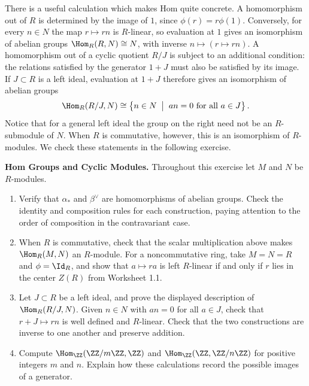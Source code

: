 \documentclass[12pt,reqno]{amsart}
\begin{document}
There is a useful calculation which makes Hom quite concrete. A homomorphism out of $R$ is determined by the image of $1$, since $\phi(r)=r\phi(1)$. Conversely, for every $n\in N$ the map $r\mapsto rn$ is $R$-linear, so evaluation at $1$ gives an isomorphism of abelian groups $\Hom_R(R,N)\cong N$, with inverse $n\mapsto(r\mapsto rn)$. A homomorphism out of a cyclic quotient $R/J$ is subject to an additional condition: the relations satisfied by the generator $1+J$ must also be satisfied by its image. If $J\subset R$ is a left ideal, evaluation at $1+J$ therefore gives an isomorphism of abelian groups
\[
\Hom_R(R/J,N)\cong\left\{n\in N \;\; \big| \;\; an=0\text{ for all }a\in J\right\}.
\]
Notice that for a general left ideal the group on the right need not be an $R$-submodule of $N$. When $R$ is commutative, however, this is an isomorphism of $R$-modules. We check these statements in the following exercise.

\hrulefill

\begin{problems}
\item\label{h:hom} \textbf{Hom Groups and Cyclic Modules.} Throughout this exercise let $M$ and $N$ be $R$-modules.
\begin{enumerate}
\item Verify that $\alpha_*$ and $\beta^{\vee}$ are homomorphisms of abelian groups. Check the identity and composition rules for each construction, paying attention to the order of composition in the contravariant case.
\item When $R$ is commutative, check that the scalar multiplication above makes $\Hom_R(M,N)$ an $R$-module. For a noncommutative ring, take $M=N=R$ and $\phi=\Id_R$, and show that $a\mapsto ra$ is left $R$-linear if and only if $r$ lies in the center $Z(R)$ from Worksheet 1.1.
\item Let $J\subset R$ be a left ideal, and prove the displayed description of $\Hom_R(R/J,N)$. Given $n\in N$ with $an=0$ for all $a\in J$, check that $r+J\mapsto rn$ is well defined and $R$-linear. Check that the two constructions are inverse to one another and preserve addition.
\item Compute $\Hom_{\ZZ}(\ZZ/m\ZZ,\ZZ)$ and $\Hom_{\ZZ}(\ZZ,\ZZ/n\ZZ)$ for positive integers $m$ and $n$. Explain how these calculations record the possible images of a generator.
\end{enumerate}
\end{problems}

\hrulefill
\end{document}
